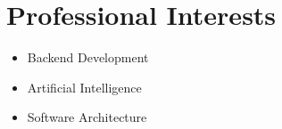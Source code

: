 \section*{Professional Interests}

\begin{itemize}
    \item Backend Development
    \item Artificial Intelligence
    \item Software Architecture
\end{itemize}
